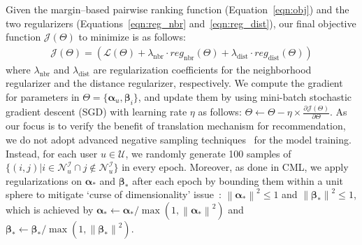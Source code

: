 \documentclass[conference]{IEEEtran}
\newcommand{\norm}[1]{\left\lVert#1\right\rVert}
\begin{document}
\medskip
{}
Given the margin--based pairwise ranking function (Equation~\ref{eqn:obj}) and the two regularizers (Equations~\ref{eqn:reg_nbr} and~\ref{eqn:reg_dist}), our final objective function $\mathcal{J}(\Theta)$ to minimize is as follows:
\begin{align*}
\mathcal{J}(\Theta) = \left( \mathcal{L}(\Theta) + \lambda_{\mathrm{nbr}}\cdot re{g_{\mathrm{nbr}}}(\Theta ) + \lambda_{\mathrm{dist}}\cdot re{g_{\mathrm{dist}}}(\Theta ) \right) 
\end{align*}
where $\lambda_{\mathrm{nbr}}$ and $\lambda_{\mathrm{dist}}$ are regularization coefficients for the neighborhood regularizer and the distance regularizer, respectively. We compute the gradient for parameters in $\Theta=\{\bm{\alpha}_u,\bm{\beta}_i\}$, and update them by using mini-batch stochastic gradient descent (SGD) with learning rate $\eta$ as follows:
$	\Theta \leftarrow \Theta - \eta \times \frac{\partial\mathcal{J}(\Theta)}{\partial\Theta}$.
As our focus is to verify the benefit of translation mechanism for recommendation, we do not adopt advanced negative sampling techniques~\cite{he2016fast,pan2008one,rendle2014improving,weston2011wsabie} for the model training.
Instead, for each user $u\in\mathcal{U}$, we randomly generate 100 samples of $\{(i,j)|i\in{\mathcal{N}^\mathcal{I}_u} \cap j\notin{\mathcal{N}^\mathcal{I}_u}\}$ in every epoch. 
Moreover, as done in CML, we apply regularizations on $\bm{\alpha}_*$ and $\bm{\beta}_*$ after each epoch by bounding them within a unit sphere to mitigate `curse of dimensionality' issue~\cite{bordes2013translating,lin2015learning}: $\norm{\bm{\alpha}_*}^2 \leq 1$ and $\norm{\bm{\beta}_*}^2 \leq 1$, which is achieved by $\bm{\alpha}_*\leftarrow\bm{\alpha}_*/\max(1,\norm{\bm{\alpha}_*}^2)$ and $\bm{\beta}_*\leftarrow\bm{\beta}_*/\max(1,\norm{\bm{\beta}_*}^2)$.
\end{document}
